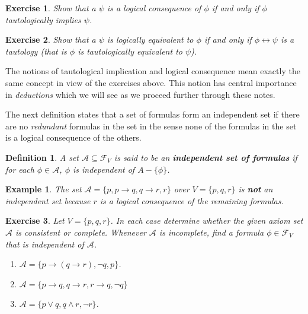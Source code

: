 \documentclass[a4paper,11pt]{article}
\newtheorem{definition}{Definition}
\newtheorem{exercise}{Exercise}
\newtheorem{example}{Example}
\begin{document}
\begin{exercise}
Show that a $\psi$ is a logical consequence of $\phi$ if and only if $\phi$ tautologically
implies $\psi$.    
\end{exercise}

\begin{exercise}
Show that a $\psi$ is logically equivalent to $\phi$ if and only if $\phi\leftrightarrow \psi$ 
is a tautology (that is $\phi$ is tautologically equivalent to $\psi$).  
\end{exercise}

The notions of tautological implication and logical consequence mean exactly the same
concept in view of the exercises above.  This notion has central importance in {\em deductions}
which we will see as we proceed further through these notes.  

The next definition states that a set of formulas form an independent set if there are no {\em redundant}
formulas in the set in the sense none of the formulas in the set is a logical consequence of the others.  

\begin{definition}
 A set $\mathcal{A}\subseteq \mathcal{F}_V$ is said to be an {\bf independent set of formulas} if 
 for each $\phi \in \mathcal{A}$, $\phi$ is independent of $A-\{\phi\}$.  
\end{definition}

\begin{example}
 The set $\mathcal{A}=\{p,p\rightarrow q, q\rightarrow r, r\}$ over $V=\{p,q,r\}$ is {\bf not} an independent set because $r$ is a logical
 consequence of the remaining formulas.  
\end{example}


\begin{exercise}
Let $V=\{p,q,r\}$.  In each case determine whether the given axiom set $\mathcal{A}$ is consistent or complete.
Whenever $\mathcal{A}$ is incomplete, find a formula $\phi\in \mathcal{F}_{V}$ that is independent of $\mathcal{A}$.  
\begin{enumerate}
 \item $\mathcal{A}=\{p\rightarrow (q\rightarrow r), \neg q, p\}$.  
 \item $\mathcal{A}=\{p\rightarrow q, q\rightarrow r, r\rightarrow q, \neg q \}$
 \item $\mathcal{A}=\{p\vee q, q\wedge r, \neg r\}$.  
\end{enumerate}
\end{exercise}



\end{document}
